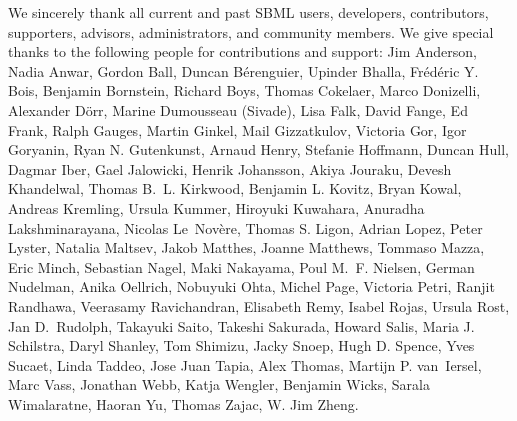 \documentclass{sbml-paper}
\begin{document}
We sincerely thank all current and past SBML users, developers, contributors, supporters, advisors, administrators, and community members.  We give special thanks to the following people for contributions and support:
Jim Anderson,
Nadia Anwar,
Gordon Ball,
Duncan B\'{e}renguier,
Upinder Bhalla,
Fr\'{e}d\'{e}ric Y. Bois,
Benjamin Bornstein,
Richard Boys,
Thomas Cokelaer,
Marco Donizelli,
Alexander D\"{o}rr,
Marine Dumousseau (Sivade),
Lisa Falk,
David Fange,
Ed Frank,
Ralph Gauges,
Martin Ginkel,
Mail Gizzatkulov,
Victoria Gor,
Igor Goryanin,
Ryan N. Gutenkunst,
Arnaud Henry,
Stefanie Hoffmann,
Duncan Hull,
Dagmar Iber,
Gael Jalowicki,
Henrik Johansson,
Akiya Jouraku,
Devesh Khandelwal,
Thomas B.~L. Kirkwood,
Benjamin L. Kovitz,
Bryan Kowal,
Andreas Kremling,
Ursula Kummer,
Hiroyuki Kuwahara,
Anuradha Lakshminarayana,
Nicolas Le~Nov\`{e}re,
Thomas S. Ligon,
Adrian Lopez,
Peter Lyster,
Natalia Maltsev,
Jakob Matthes,
Joanne Matthews,
Tommaso Mazza,
Eric Minch,
Sebastian Nagel,
Maki Nakayama,
Poul M.~F. Nielsen,
German Nudelman,
Anika Oellrich,
Nobuyuki Ohta,
Michel Page,
Victoria Petri,
Ranjit Randhawa,
Veerasamy Ravichandran,
Elisabeth Remy,
Isabel Rojas,
Ursula Rost,
Jan D.~Rudolph,
Takayuki Saito,
Takeshi Sakurada,
Howard Salis,
Maria J. Schilstra,
Daryl Shanley,
Tom Shimizu,
Jacky Snoep,
Hugh D. Spence,
Yves Sucaet,
Linda Taddeo,
Jose Juan Tapia,
Alex Thomas,
Martijn P. van~Iersel,
Marc Vass,
Jonathan Webb,
Katja Wengler,
Benjamin Wicks,
Sarala Wimalaratne,
Haoran Yu,
Thomas Zajac,
W. Jim Zheng.
\end{document}
